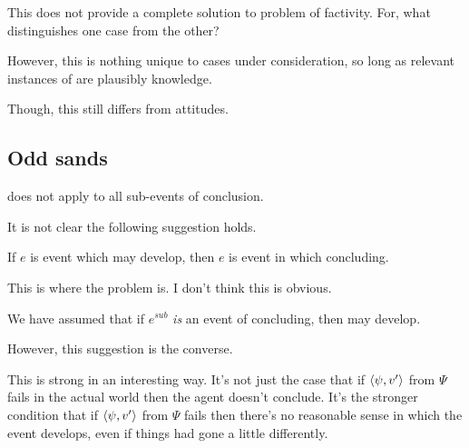 \begin{note}
  This does not provide a complete solution to problem of factivity.
  For, what distinguishes one case from the other?

  However, this is nothing unique to cases under consideration, so long as relevant instances of \fc{} are plausibly knowledge.

  Though, this still differs from attitudes.
\end{note}

\subsection{Odd sands}

\begin{note}
  \curb{} does not apply to all sub-events of conclusion.

  It is not clear the following suggestion holds.
  \begin{suggestion}
    If \(e\) is event which may develop, then \(e\) is event in which concluding.

    {
      \color{red}
      This is where the problem is.
      I don't think this is obvious.

      We have assumed that if \(e^{sub}\) \emph{is} an event of concluding, then may develop.

      However, this suggestion is the converse.
    }
  \end{suggestion}
\end{note}

\begin{note}
  \color{red}

  This is strong in an interesting way.
  It's not just the case that if \(\langle \psi, v' \rangle\) from \(\Psi\) fails in the actual world then the agent doesn't conclude.
  It's the stronger condition that if \(\langle \psi, v' \rangle\) from \(\Psi\) fails then there's no reasonable sense in which the event develops, even if things had gone a little differently.
\end{note}

